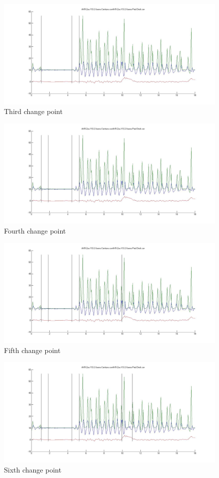 \documentclass[french]{article}
\begin{document}
\begin{figure}[h]
	\includegraphics[scale=0.3]{seg3.jpg}
	\caption{Third change point}
\end{figure}

\begin{figure}[h]
	\includegraphics[scale=0.3]{seg4.jpg}
	\caption{Fourth change point}
\end{figure}

\begin{figure}[h]
	\includegraphics[scale=0.3]{seg5.jpg}
	\caption{Fifth change point}
\end{figure}

\begin{figure}[h]
	\includegraphics[scale=0.3]{seg6.jpg}
	\caption{Sixth change point}
\end{figure}
\end{document}
